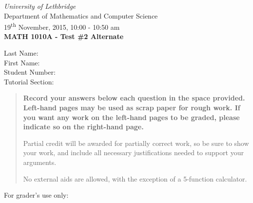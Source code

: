 \documentclass[12pt]{article}
\newcommand{\skipline}{\vspace{12pt}}
\begin{document}
\author{Instructor: Sean Fitzpatrick}
\thispagestyle{plain}
\begin{center}
\emph{University of Lethbridge}\\
Department of Mathematics and Computer Science\\
19\textsuperscript{th} November, 2015, 10:00 - 10:50 am\\
{\bf MATH 1010A - Test \#2 Alternate}\\
\end{center}
\skipline \skipline \skipline \noindent \skipline
Last Name:\underline{\hspace{353pt}}\\
\skipline
First Name:\underline{\hspace{350pt}}\\
\skipline
Student Number:\underline{\hspace{323pt}}\\
\skipline
Tutorial Section: \underline{\hspace{320pt}}\\


\vspace{0.5in}


\begin{quote}
 {\bf Record your answers below each question in the space provided.    Left-hand pages may be used as scrap paper for rough work.  If you want any work on the left-hand pages to be graded, please indicate so on the right-hand page.
 
 \bigskip
 
Partial credit will be awarded for partially correct work, so be sure to show your work, and include all necessary justifications needed to support your arguments.

\bigskip

No external aids are allowed, with the exception of a 5-function calculator.}
\end{quote}


\vspace{0.5in}

For grader's use only:
\end{document}

